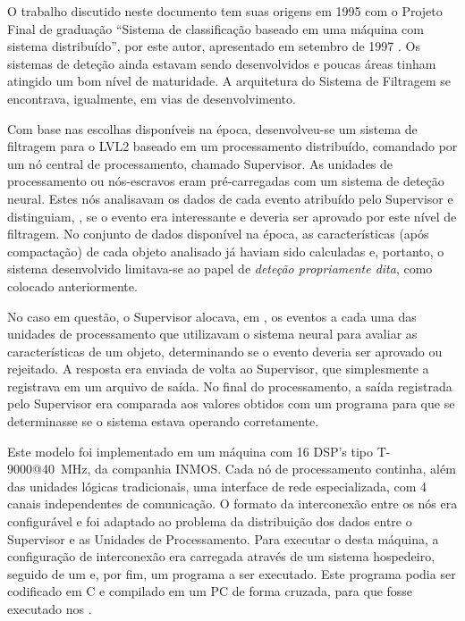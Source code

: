 O trabalho discutido neste documento tem suas origens em 1995 com o Projeto
Final de graduação ``Sistema de classificação baseado em uma máquina com
sistema distribuído'', por este autor, apresentado em setembro de 1997
\cite{aa:projeto-final}. Os sistemas de deteção ainda estavam sendo
desenvolvidos e poucas áreas tinham atingido um bom nível de maturidade. A
arquitetura do Sistema de Filtragem se encontrava, igualmente, em vias de
desenvolvimento.

Com base nas escolhas disponíveis na época, desenvolveu-se um sistema de
filtragem para o LVL2 baseado em um processamento distribuído, comandado por
um nó central de processamento, chamado Supervisor. As unidades de
processamento ou nós-escravos eram pré-carregadas com um sistema de deteção
neural. Estes nós analisavam os dados de cada evento atribuído pelo Supervisor
e distinguiam, , se o evento era interessante e deveria ser
aprovado por este nível de filtragem. No conjunto de dados disponível na
época, as características (após compactação) de cada objeto analisado já
haviam sido calculadas e, portanto, o sistema desenvolvido limitava-se ao papel
de \textit{deteção propriamente dita}, como colocado anteriormente.

No caso em questão, o Supervisor alocava, em , os eventos a
cada uma das unidades de processamento que utilizavam o sistema neural para
avaliar as características de um objeto, determinando se o evento deveria ser
aprovado ou rejeitado. A resposta era enviada de volta ao Supervisor, que
simplesmente a registrava em um arquivo de saída. No final do processamento, a
saída registrada pelo Supervisor era comparada aos valores obtidos com um
programa  para que se determinasse se o sistema estava operando
corretamente.

Este modelo foi implementado em um máquina com 16 DSP's tipo T-9000@40~MHz, da
companhia INMOS. Cada nó de processamento continha, além das unidades lógicas
tradicionais, uma interface de rede especializada, com 4 canais independentes
de comunicação. O formato da interconexão entre os nós era configurável e foi
adaptado ao problema da distribuição dos dados entre o Supervisor e as
Unidades de Processamento. Para executar o  desta máquina, a
configuração de interconexão era carregada através de um sistema hospedeiro,
seguido de um  e, por fim, um programa a ser
executado. Este programa podia ser codificado em C e compilado em um PC de
forma cruzada, para que fosse executado nos
.

